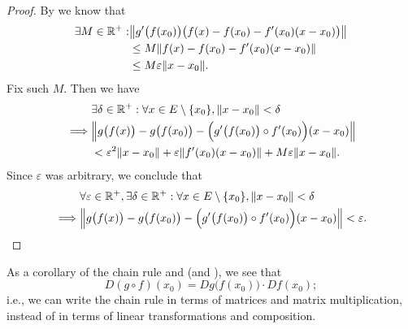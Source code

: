 \begin{proof}
  By  we know that
  \begin{align*}
    \exists M \in \R^+ : & \norm*{g'\big(f(x_0)\big) \big(f(x) - f(x_0) - f'(x_0) (x - x_0)\big)} \\
                         & \leq M \norm*{f(x) - f(x_0) - f'(x_0) (x - x_0)}                       \\
                         & \leq M \varepsilon \norm*{x - x_0}.
  \end{align*}
  Fix such \(M\).
  Then we have
  \begin{align*}
             & \exists \delta \in \R^+ : \forall x \in E \setminus \set{x_0}, \norm*{x - x_0} < \delta                 \\
    \implies & \norm*{g\big(f(x)\big) - g\big(f(x_0)\big) - \Big(g'\big(f(x_0)\big) \circ f'(x_0)\Big) (x - x_0)}      \\
             & < \varepsilon^2 \norm*{x - x_0} + \varepsilon \norm*{f'(x_0)(x - x_0)} + M \varepsilon \norm*{x - x_0}.
  \end{align*}
  Since \(\varepsilon\) was arbitrary, we conclude that
  \begin{align*}
             & \forall \varepsilon \in \R^+, \exists \delta \in \R^+ : \forall x \in E \setminus \set{x_0}, \norm*{x - x_0} < \delta \\
    \implies & \norm*{g\big(f(x)\big) - g\big(f(x_0)\big) - \Big(g'\big(f(x_0)\big) \circ f'(x_0)\Big) (x - x_0)} < \varepsilon.
  \end{align*}
\end{proof}

\begin{note}
  As a corollary of the chain rule and  (and ), we see that
  \[
    D (g \circ f)(x_0) = D g\big(f(x_0)\big) \cdot D f(x_0);
  \]
  i.e., we can write the chain rule in terms of matrices and matrix multiplication, instead of in terms of linear transformations and composition.
\end{note}


